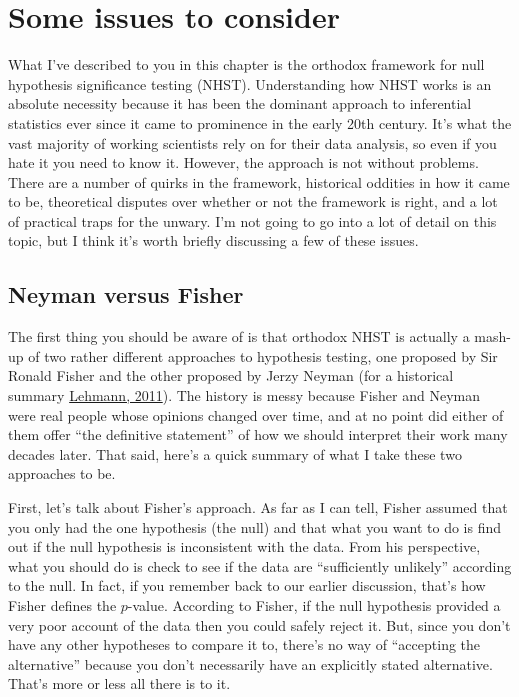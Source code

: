 \documentclass[
]{book}
\begin{document}
\hypertarget{nhstmess}{%
\section{Some issues to consider}\label{nhstmess}}

What I've described to you in this chapter is the orthodox framework for null hypothesis significance testing (NHST). Understanding how NHST works is an absolute necessity because it has been the dominant approach to inferential statistics ever since it came to prominence in the early 20th century. It's what the vast majority of working scientists rely on for their data analysis, so even if you hate it you need to know it. However, the approach is not without problems. There are a number of quirks in the framework, historical oddities in how it came to be, theoretical disputes over whether or not the framework is right, and a lot of practical traps for the unwary. I'm not going to go into a lot of detail on this topic, but I think it's worth briefly discussing a few of these issues.

\hypertarget{neyman-versus-fisher}{%
\subsection{Neyman versus Fisher}\label{neyman-versus-fisher}}

The first thing you should be aware of is that orthodox NHST is actually a mash-up of two rather different approaches to hypothesis testing, one proposed by Sir Ronald Fisher and the other proposed by Jerzy Neyman (for a historical summary \protect\hyperlink{ref-Lehmann2011}{Lehmann, 2011}). The history is messy because Fisher and Neyman were real people whose opinions changed over time, and at no point did either of them offer ``the definitive statement'' of how we should interpret their work many decades later. That said, here's a quick summary of what I take these two approaches to be.

First, let's talk about Fisher's approach. As far as I can tell, Fisher assumed that you only had the one hypothesis (the null) and that what you want to do is find out if the null hypothesis is inconsistent with the data. From his perspective, what you should do is check to see if the data are ``sufficiently unlikely'' according to the null. In fact, if you remember back to our earlier discussion, that's how Fisher defines the \(p\)-value. According to Fisher, if the null hypothesis provided a very poor account of the data then you could safely reject it. But, since you don't have any other hypotheses to compare it to, there's no way of ``accepting the alternative'' because you don't necessarily have an explicitly stated alternative. That's more or less all there is to it.
\end{document}
